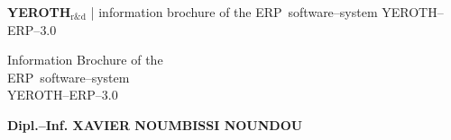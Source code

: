 \documentclass[a4paper, 10pt]{article}
\newcommand{\erpsoftwaresystem}{ERP~software--system\xspace}
\newcommand{\yerothrd}{\textcolor{yerothColorGreen}
			{\textsc{\textcolor{yerothColorRed}{YEROTH}}$_{\text{r\&d}}$\xspace}}
\newcommand{\yerotherpblack}{YEROTH--ERP--$3.0$\xspace}
\newcommand{\myfullacademicname}{Dipl.--Inf. XAVIER NOUMBISSI NOUNDOU\xspace}
\begin{document}
{\bf \LARGE \yerothrd} {| \sc \scriptsize information brochure of the \erpsoftwaresystem \yerotherpblack}

\vspace{2.0em}

\begin{center}
{\LARGE Information Brochure of the \\
    \vspace{0.3em}
    \erpsoftwaresystem \\
    \vspace{0.5em}
    \yerotherpblack}
\end{center}

\vspace{2.0em}

\begin{center}
{\large \textbf{\myfullacademicname}}
\end{center}

\vspace{3.0em}
\end{document}
